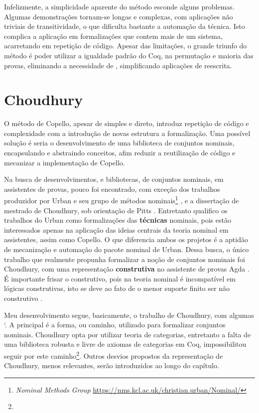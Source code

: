 Infelizmente, a simplicidade aparente do método esconde alguns problemas. Algumas demonstrações tornam-se longas e complexas, com aplicações não triviais de transitividade, o que dificulta bastante a automação da técnica. Isto complica a aplicação em formalizações que contem mais de um sistema, acarretando em repetição de código. Apesar das limitações, o grande triunfo do método é poder utilizar a igualdade padrão do Coq, na permutação e maioria das provas, eliminando a necessidade de \setoids, simplificando aplicações de reescrita.

\section{Choudhury}\label{sec:choudhury}
O método de Copello, apesar de simples e direto, introduz repetição de código e complexidade com a introdução de novas estrutura a formalização. Uma possível solução é seria o desenvolvimento de uma biblioteca de conjuntos nominais, encapsulando e abstraindo conceitos, afim reduzir a reutilização de código e mecanizar a implementação de Copello.

Na busca de desenvolvimentos, e bibliotecas, de conjuntos nominais, em assistentes de provas, pouco foi encontrado, com exceção dos trabalhos produzidor por Urban e seu grupo de métodos nominais\footnote{\textit{Nominal Methods Group} \url{https://nms.kcl.ac.uk/christian.urban/Nominal/}} \cite{Urban2008,Urban2005,Urban2006,Huffman2010,Urban2011}, e a dissertação de mestrado de Choudhury, sob orientação de Pitts \cite{Choudhury2015}. Entretanto qualifico os trabalhos do Urban como formalizações das \textbf{técnicas} nominais, pois estão interessados apenas na aplicação das ideias centrais da teoria nominal em assistentes, assim como Copello. O que diferencia ambos os projetos é a aptidão de mecanização e automação do pacote nominal de Urban. Dessa busca, o único trabalho que realmente propunha formalizar a noção de conjuntos nominais foi Choudhury, com uma representação \textbf{construtiva} no assistente de provas Agda \cite{Bove2009}. É importante frisar o construtivo, pois na teoria nominal é incompatível em lógicas construtivas, isto se deve ao fato de o menor suporte finito ser não construtivo \cite{Swan2016,Swan2017}.

Meu desenvolvimento segue, basicamente, o trabalho de Choudhury, com algumas `. A principal é a forma, ou caminho, utilizado para formalizar conjuntos nominais. Choudhury opta por utilizar teoria de categorias, entretanto a falta de uma biblioteca robusta e livre de axiomas de categorias em Coq, impossibilitou seguir por este caminho\footnote{}. Outros desvios propostos da representação de Choudhury, menos relevantes, serão introduzidos ao longo do capítulo.

